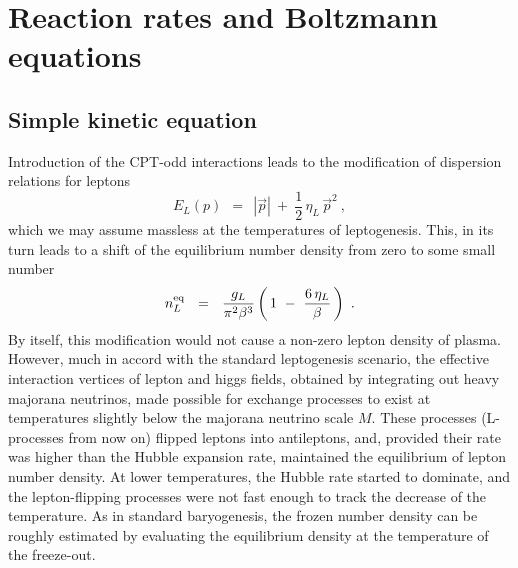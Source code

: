 \documentclass[12pt]{revtex4}
\newcommand{\eq}{{\rm eq}}
\begin{document}
\section{Reaction rates and Boltzmann equations}

\subsection{Simple kinetic equation}

Introduction of the CPT-odd interactions leads to the modification of 
dispersion relations for leptons
\[
	E_L(p) ~~=~~ |\vec{p}| ~+~ \frac 12\, \eta_L\, \vec{p}^2~,
\]
which we may assume massless at the temperatures of leptogenesis.
This, in its turn leads to a shift of the equilibrium number density
from zero to some small number
\[
        n_L^\eq ~~=~~ \frac{g_L}{\pi^2 \beta^3}
			\left (\, 1 ~-~ \frac{6\,\eta_L}{\beta} \,\right)~.
\]
By itself, this modification would not cause a non-zero lepton density
of plasma. 
However, much in accord with the standard leptogenesis scenario, the 
effective interaction vertices of lepton and higgs fields,
obtained by integrating out heavy majorana neutrinos, made possible
for exchange processes to exist at temperatures slightly below the
majorana neutrino scale $ M $.
These processes (L-processes from now on) flipped leptons into antileptons, 
and, provided their
rate was higher than the Hubble expansion rate, maintained the equilibrium
of lepton number density.
At lower temperatures, the Hubble rate started to dominate, and the
lepton-flipping processes were not fast enough to track the decrease
of 
the temperature. 
As in standard baryogenesis, the frozen number density can be roughly
estimated by evaluating the equilibrium density at the temperature
of the freeze-out.
\end{document}

